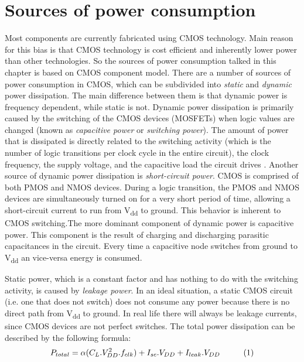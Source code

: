 \section{Sources of power consumption}\label{src_pwr}
Most components are currently fabricated using CMOS technology. Main reason for this bias is that CMOS technology is cost efficient and inherently lower power than other technologies. So the sources of power consumption talked in this chapter is based on CMOS component model. There are a number of sources of power consumption in CMOS, which can be subdivided into \textit{static} and \textit{dynamic} power dissipation. The main difference between them is that dynamic power is frequency dependent, while static is not. Dynamic power dissipation is primarily caused by the switching of the CMOS devices (MOSFETs) when logic values are changed (known as \textit{capacitive power} or \textit{switching power}). The amount of power that is dissipated is directly related to the switching activity (which is the number of logic transitions per clock cycle in the entire circuit), the clock frequency, the supply voltage, and the capacitive load the circuit drives \cite{PowerAwareDesign}. Another source of dynamic power dissipation is \textit{short-circuit power}. CMOS is comprised of both PMOS and NMOS devices. During a logic transition, the PMOS and NMOS devices are simultaneously turned on for a very short period of time, allowing a short-circuit current to run from V\textsubscript{dd} to ground\cite{Low-powercmos,LowPowerDesign}. This behavior is inherent to CMOS switching.The more dominant component of dynamic power is capacitive power. This component is the result of charging and discharging parasitic capacitances in the circuit. Every time a capacitive node switches from ground to V\textsubscript{dd} an vice-versa energy is consumed. 

Static power, which is a constant factor and has nothing to do with the switching activity, is caused by \textit{leakage power}. In an ideal situation, a static CMOS circuit (i.e. one that does not switch) does not consume any power because there is no direct path from V\textsubscript{dd} to 
ground. In real life there will always be leakage currents, since CMOS devices are not 
perfect switches. The total power dissipation can be described by the following formula:
\[P_{total} = \alpha(C_L . V_{DD}^2.f_{clk}) + I_{sc}. V_{DD} + I_{leak} . V_{DD}    \hspace{10mm} (1) \]

